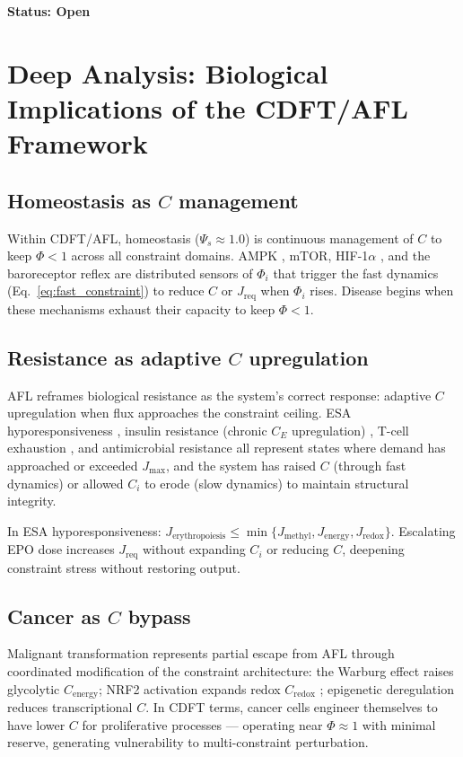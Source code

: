 \documentclass[11pt]{article}
\newcommand{\Jmax}{J_{\max}}
\newcommand{\Jreq}{J_{\mathrm{req}}}
\begin{document}
\textbf{Status: Open}


\section{Deep Analysis: Biological Implications of the CDFT/AFL Framework}
\subsection{Homeostasis as $C$ management}

Within CDFT/AFL, homeostasis ($\Psi_s \approx 1.0$) is continuous management of $C$ to keep $\Phi < 1$ across all constraint domains. AMPK \citep{hardie2014}, mTOR, HIF-1$\alpha$ \citep{semenza2012}, and the baroreceptor reflex are distributed sensors of $\Phi_i$ that trigger the fast dynamics (Eq.~\ref{eq:fast_constraint}) to reduce $C$ or $\Jreq$ when $\Phi_i$ rises. Disease begins when these mechanisms exhaust their capacity to keep $\Phi < 1$.

\subsection{Resistance as adaptive $C$ upregulation}

AFL reframes biological resistance as the system's correct response: adaptive $C$ upregulation when flux approaches the constraint ceiling. ESA hyporesponsiveness \citep{macdougall1995,vaziri2004}, insulin resistance (chronic $C_E$ upregulation) \citep{DeFronzo2009,PetersenShulman2018}, T-cell exhaustion \citep{ONeill2016,buck2015}, and antimicrobial resistance \citep{davies2010,AnderssonHughes2010} all represent states where demand has approached or exceeded $\Jmax$, and the system has raised $C$ (through fast dynamics) or allowed $C_i$ to erode (slow dynamics) to maintain structural integrity.

In ESA hyporesponsiveness: $J_{\mathrm{erythropoiesis}} \leq \min\{J_{\mathrm{methyl}}, J_{\mathrm{energy}}, J_{\mathrm{redox}}\}$. Escalating EPO dose increases $\Jreq$ without expanding $C_i$ or reducing $C$, deepening constraint stress without restoring output.

\subsection{Cancer as $C$ bypass}

Malignant transformation represents partial escape from AFL through coordinated modification of the constraint architecture: the Warburg effect \citep{Warburg1956,VanderHeiden2009} raises glycolytic $C_{\mathrm{energy}}$; NRF2 activation expands redox $C_{\mathrm{redox}}$ \citep{schieber2014}; epigenetic deregulation reduces transcriptional $C$. In CDFT terms, cancer cells engineer themselves to have lower $C$ for proliferative processes --- operating near $\Phi \approx 1$ with minimal reserve, generating vulnerability to multi-constraint perturbation.
\end{document}
